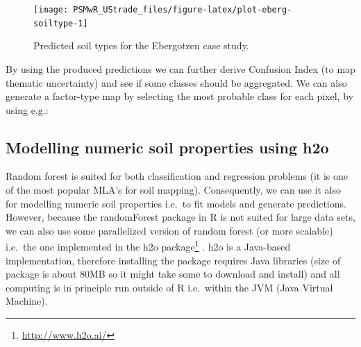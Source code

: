 \documentclass[graybox,natbib,nospthms,UStrade]{svmono}
\newenvironment{Shaded}{\begin{snugshade}}{\end{snugshade}}
\newcommand{\CommentTok}[1]{\textcolor[rgb]{0.37,0.37,0.37}{\textit{#1}}}
\newcommand{\DecValTok}[1]{\textcolor[rgb]{0.06,0.06,0.06}{#1}}
\newcommand{\KeywordTok}[1]{\textcolor[rgb]{0.27,0.27,0.27}{\textbf{#1}}}
\newcommand{\NormalTok}[1]{#1}
\newcommand{\OperatorTok}[1]{\textcolor[rgb]{0.43,0.43,0.43}{\textbf{#1}}}
\newcommand{\StringTok}[1]{\textcolor[rgb]{0.5,0.5,0.5}{#1}}
\renewcommand{\href}[2]{#2 (\url{#1})}
\renewcommand{\href}[2]{#2\footnote{\url{#1}}}
\begin{document}
\begin{figure}[H]

{\centering \texttt{[image: PSMwR\_UStrade\_files/figure-latex/plot-eberg-soiltype-1]} 

}

\caption{Predicted soil types for the Ebergotzen case study.}\label{fig:plot-eberg-soiltype}
\end{figure}

By using the produced predictions we can further derive Confusion Index (to map thematic uncertainty) and see if some classes should be aggregated. We can also generate a factor-type map by selecting the most probable class for each pixel, by using e.g.:

\begin{Shaded}
\end{Shaded}

\hypertarget{modelling-numeric-soil-properties-using-h2o}{%
\subsection{Modelling numeric soil properties using h2o}\label{modelling-numeric-soil-properties-using-h2o}}

Random forest is suited for both classification and regression problems (it is one of the most popular MLA's for soil mapping). Consequently, we can use it also for modelling numeric soil properties i.e.~to fit models and generate predictions. However, because the randomForest package in R is not suited for large data sets, we can also use some parallelized version of random forest (or more scalable) i.e.~the one implemented in the \href{http://www.h2o.ai/}{h2o package} \citep{richter2015multi}. h2o is a Java-based implementation, therefore installing the package requires Java libraries (size of package is about 80MB so it might take some to download and install) and all computing is in principle run outside of R i.e.~within the JVM (Java Virtual Machine).
\end{document}
